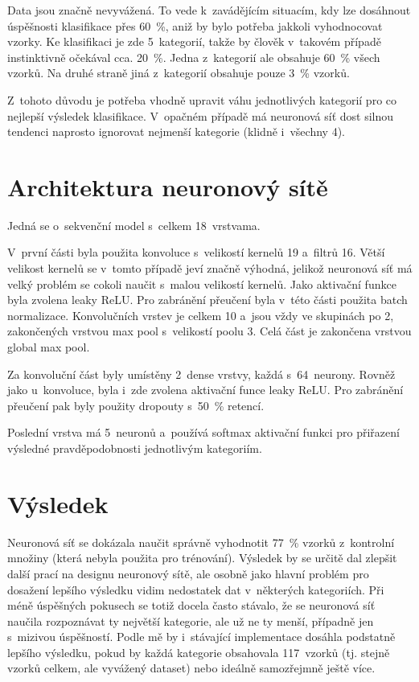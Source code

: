 \documentclass[\languages,a4paper,12pt]{article}
\begin{document}
Data jsou značně nevyvážená.
To vede k zavádějícím situacím, kdy lze dosáhnout úspěšnosti klasifikace přes \SI{60}{\percent}, aniž by bylo potřeba jakkoli vyhodnocovat vzorky.
Ke klasifikaci je zde \num{5} kategorií, takže by člověk v takovém případě instinktivně očekával cca. \SI{20}{\percent}.
Jedna z kategorií ale obsahuje \SI{60}{\percent} všech vzorků.
Na druhé straně jiná z kategorií obsahuje pouze \SI{3}{\percent} vzorků.

Z tohoto důvodu je potřeba vhodně upravit váhu jednotlivých kategorií pro co nejlepší výsledek klasifikace.
V opačném případě má neuronová síť dost silnou tendenci naprosto ignorovat nejmenší kategorie (klidně i všechny \num{4}).

\section{Architektura neuronový sítě}

Jedná se o sekvenční model s celkem \num{18} vrstvama.

V první části byla použita konvoluce s velikostí kernelů \num{19} a filtrů \num{16}.
Větší velikost kernelů se v tomto případě jeví značně výhodná, jelikož neuronová síť má velký problém se cokoli naučit s malou velikostí kernelů.
Jako aktivační funkce byla zvolena leaky ReLU.
Pro zabránění přeučení byla v této části použita batch normalizace.
Konvolučních vrstev je celkem \num{10} a jsou vždy ve skupinách po \num{2}, zakončených vrstvou max pool s velikostí poolu \num{3}.
Celá část je zakončena vrstvou global max pool.

Za konvoluční část byly umístěny \num{2} dense vrstvy, každá s \num{64} neurony.
Rovněž jako u konvoluce, byla i zde zvolena aktivační funce leaky ReLU.
Pro zabránění přeučení pak byly použity dropouty s \SI{50}{\percent} retencí.

Poslední vrstva má \num{5} neuronů a používá softmax aktivační funkci pro přiřazení výsledné pravděpodobnosti jednotlivým kategoriím.

\section{Výsledek}

Neuronová síť se dokázala naučit správně vyhodnotit \SI{77}{\percent} vzorků z kontrolní množiny (která nebyla použita pro trénování).
Výsledek by se určitě dal zlepšit další prací na designu neuronový sítě, ale osobně jako hlavní problém pro dosažení lepšího výsledku vidim nedostatek dat v některých kategoriích.
Při méně úspěšných pokusech se totiž docela často stávalo, že se neuronová síť naučila rozpoznávat ty největší kategorie, ale už ne ty menší, případně jen s mizivou úspěšností.
Podle mě by i stávající implementace dosáhla podstatně lepšího výsledku, pokud by každá kategorie obsahovala \num{117} vzorků (tj. stejně vzorků celkem, ale vyvážený dataset) nebo ideálně samozřejmně ještě více.
\end{document}
